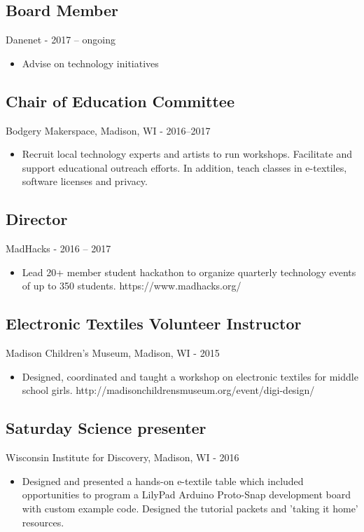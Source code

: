 \documentclass[../main.tex]{subfiles}
\begin{document}

\subsection*{Board Member}
     Danenet - 2017 -- ongoing
\begin{itemize}
		\item{Advise on technology initiatives}
\end{itemize}

\subsection*{Chair of Education Committee}
     Bodgery Makerspace, Madison, WI - 2016--2017
\begin{itemize}
		\item{Recruit local technology experts and artists to run workshops. Facilitate and support educational outreach efforts. In addition, teach classes in e-textiles, software licenses and privacy.}
	\end{itemize}

\subsection*{Director}
     MadHacks - 2016 -- 2017
\begin{itemize}
		\item{Lead 20+ member student hackathon to organize quarterly technology events of up to 350 students. https://www.madhacks.org/}
	\end{itemize}

\subsection*{Electronic Textiles Volunteer Instructor}
     Madison Children's Museum, Madison, WI - 2015
\begin{itemize}
		\item{Designed, coordinated and taught a workshop on electronic textiles for middle school girls. http://madisonchildrensmuseum.org/event/digi-design/}
	\end{itemize}

\subsection*{Saturday Science presenter}
     Wisconsin Institute for Discovery, Madison, WI - 2016
\begin{itemize}
		\item{Designed and presented a hands-on e-textile table which included opportunities to program a LilyPad Arduino Proto-Snap development board with custom example code. Designed the tutorial packets and 'taking it home' resources.}
	\end{itemize}
\end{document}
